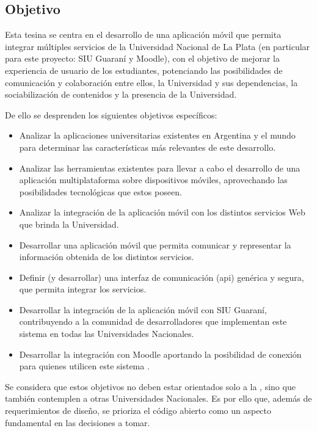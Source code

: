 \subsection{Objetivo}
\label{objetivo}

Esta tesina se centra en el desarrollo de una aplicación móvil que permita
integrar múltiples servicios de la Universidad Nacional de La Plata (en
particular para este proyecto: SIU Guaraní y Moodle), con el objetivo de mejorar
la experiencia de usuario de los estudiantes, potenciando las posibilidades de
comunicación y colaboración entre ellos, la Universidad y sus dependencias, la
sociabilización de contenidos y la presencia de la Universidad.

De ello se desprenden los siguientes objetivos específicos:

\begin{itemize}
  \item Analizar la aplicaciones universitarias existentes en Argentina y el mundo para determinar las características más relevantes de este desarrollo.

  \item Analizar las herramientas existentes para llevar a cabo el desarrollo
  de una aplicación multiplataforma sobre dispositivos móviles, aprovechando las
  posibilidades tecnológicas que estos poseen.

  \item Analizar la integración de la aplicación móvil con los distintos
  servicios Web que brinda la Universidad.

  \item Desarrollar una aplicación móvil que permita comunicar y representar la
  información obtenida de los distintos servicios.

  \item Definir (y desarrollar) una interfaz de comunicación (\gls{api}) genérica y segura, que permita integrar los servicios.

  \item Desarrollar la integración de la aplicación móvil con SIU Guaraní,
  contribuyendo a la comunidad de desarrolladores que implementan este sistema en todas las Universidades Nacionales.

  \item Desarrollar la integración con Moodle aportando la posibilidad de
  conexión para quienes utilicen este sistema .
\end{itemize}

Se considera que estos objetivos no deben estar orientados solo a la \unlp{}, sino que también contemplen a otras Universidades Nacionales. Es por ello que, además de requerimientos de diseño, se prioriza el código abierto como un aspecto fundamental en las decisiones a tomar.
